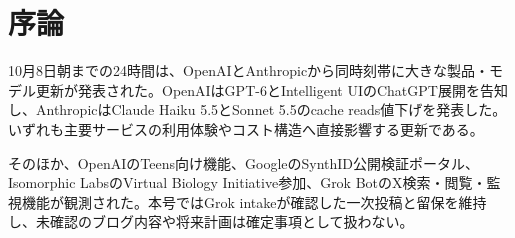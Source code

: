 \section*{序論}
10月8日朝までの24時間は、OpenAIとAnthropicから同時刻帯に大きな製品・モデル更新が発表された。OpenAIはGPT-6とIntelligent UIのChatGPT展開を告知し、AnthropicはClaude Haiku 5.5とSonnet 5.5のcache reads値下げを発表した。いずれも主要サービスの利用体験やコスト構造へ直接影響する更新である。

そのほか、OpenAIのTeens向け機能、GoogleのSynthID公開検証ポータル、Isomorphic LabsのVirtual Biology Initiative参加、Grok BotのX検索・閲覧・監視機能が観測された。本号ではGrok intakeが確認した一次投稿と留保を維持し、未確認のブログ内容や将来計画は確定事項として扱わない。
